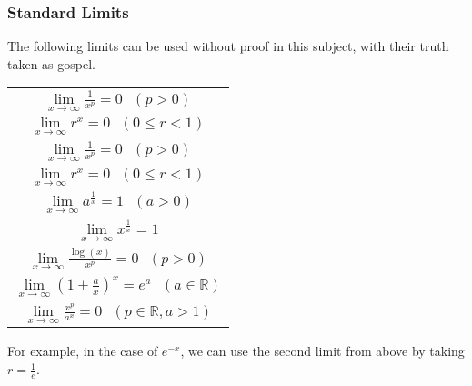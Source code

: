 \documentclass[12pt]{report}
\newenvironment{formulalist}{
    \renewcommand{\arraystretch}{2}
    \begin{center}    
        \begin{tabular}{||c||}
}{
        \end{tabular}
    \end{center}
    \renewcommand{\arraystretch}{1}
}
\newcommand{\R}{\mathbb{R}}
\newcommand{\limit}{\lim\limits}
\begin{document}
\begin{flushleft}
\subsubsection*{Standard Limits}
The following limits can be used without proof in this subject, with their 
truth taken as gospel.

\begin{formulalist}
    \(\limit_{x\rightarrow\infty}\frac{1}{x^p} = 0 \:\:\:(p > 0)\) \\
    \(\limit_{x\rightarrow\infty}r^x = 0 \:\:\:(0 \leq r < 1)\) \\
    \(\limit_{x\rightarrow\infty}\frac{1}{x^p} = 0 \:\:\:(p > 0)\) \\
    \(\limit_{x\rightarrow\infty} r^x = 0 \:\:\:(0 \leq r < 1)\) \\
    \(\limit_{x\rightarrow\infty} a^{\frac{1}{x}} = 1 \:\:\:(a > 0)\) \\
    \(\limit_{x\rightarrow\infty} x^{\frac{1}{x}} = 1\) \\
    \(\limit_{x\rightarrow\infty} \frac{\log(x)}{x^p} = 0 \:\:\:(p > 0)\) \\
    \(\limit_{x\rightarrow\infty} \left(1 + \frac{a}{x}\right)^x 
    = e^a \:\:\:(a \in \R)\) \\
    \(\limit_{x\rightarrow\infty} \frac{x^p}{a^x} 
    = 0 \:\:\:(p \in \R, a > 1)\) \\  
\end{formulalist}

For example, in the case of \(e^{-x}\), we can use the second limit from above
by taking \(r = \frac{1}{e}\).


\end{flushleft}
\end{document}
